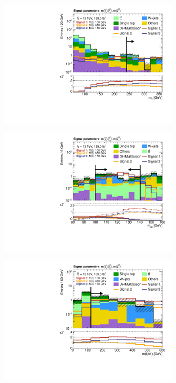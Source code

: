 \begin{figure}
\begin{subfigure}[b]{0.4\linewidth}
		\centering\includegraphics[width=\textwidth]{n1_SRHM_mct_bins/mt_both.pdf}
		\caption{\label{fig:Wh_reopt_second_round_n1_srhm_mt}}
	\end{subfigure}%
	\begin{subfigure}[b]{0.4\linewidth}
		\centering\includegraphics[width=\textwidth]{n1_SRHM_mct_bins/mbb_both.pdf}
		\caption{\label{fig:Wh_reopt_second_round_n1_srhm_mbb}}
	\end{subfigure}
	\begin{subfigure}[b]{0.4\linewidth}
		\centering\includegraphics[width=\textwidth]{n1_SRHM_mct_bins/mlb1.pdf}

\end{subfigure}
\end{figure}
